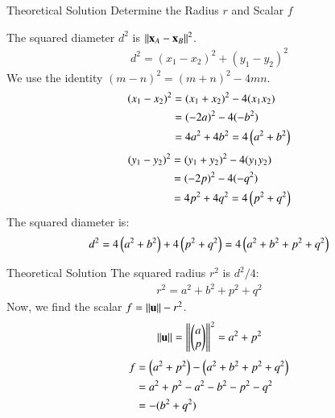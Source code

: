 \documentclass{beamer}
\begin{document}
\begin{frame}{Theoretical Solution}
 Determine the Radius $r$ and Scalar $f$

The squared diameter $d^2$ is $\left\lVert\mathbf{x}_A - \mathbf{x}_B\right\rVert^2$.
\begin{align*}
    d^2 = (x_1 - x_2)^2 + (y_1 - y_2)^2
\end{align*}
We use the identity $(m-n)^2 = (m+n)^2 - 4mn$.
\begin{align*}
    (x_1 - x_2)^2 &= (x_1 + x_2)^2 - 4(x_1 x_2) \\
    &= (-2a)^2 - 4(-b^2) \\
    &= 4a^2 + 4b^2 = 4\left(a^2 + b^2\right)
\end{align*}
\begin{align*}
    (y_1 - y_2)^2 &= (y_1 + y_2)^2 - 4(y_1 y_2) \\
    &= (-2p)^2 - 4(-q^2) \\
    &= 4p^2 + 4q^2 = 4\left(p^2 + q^2\right)
\end{align*}
The squared diameter is:
\begin{align*}
    d^2 = 4\left(a^2 + b^2\right) + 4\left(p^2 + q^2\right) = 4\left(a^2 + b^2 + p^2 + q^2\right)
\end{align*}

\end{frame}
\begin{frame}{Theoretical Solution}
The squared radius $r^2$ is $d^2/4$:
\begin{align*}
    r^2 = a^2 + b^2 + p^2 + q^2
\end{align*}
Now, we find the scalar $f = \left\lVert\mathbf{u}\right\rVert - r^2$.
\begin{align*}
    \left\lVert\mathbf{u}\right\rVert = \left\lVert \begin{pmatrix}a \\ p\end{pmatrix}\right\rVert^2 = a^2 + p^2
\end{align*}
\begin{align*}
    f &= \left(a^2 + p^2\right) - \left(a^2 + b^2 + p^2 + q^2\right) \\
    &= a^2 + p^2 - a^2 - b^2 - p^2 - q^2 \\
    &= -(b^2 + q^2)
\end{align*}


\end{frame}
\end{document}
